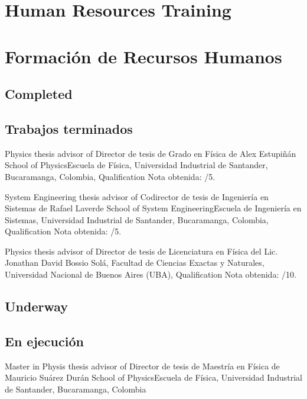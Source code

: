 \ifeng
\section*{Human Resources Training}
\else
\section*{Formación de Recursos Humanos}
\fi


\ifeng
\subsection*{Completed}
\else
\subsection*{Trabajos terminados}
\fi

\ifeng
Physics thesis advisor of
\else
Director de tesis de Grado en Física de
\fi
Alex Estupiñán \at \ifeng School of Physics\else Escuela de Física\fi, Universidad Industrial de Santander, Bucaramanga, Colombia, \ifeng Qualification \else Nota obtenida: /5.

\ifeng
System Engineering thesis advisor of
\else
Codirector de tesis de Ingeniería en Sistemas de
\fi
Rafael Laverde \at \ifeng School of System Engineering\else Escuela de Ingeniería en Sistemas\fi, Universidad Industrial de Santander, Bucaramanga, Colombia, \ifeng Qualification \else Nota obtenida: /5.

\ifeng
Physics thesis advisor of
\else
Director de tesis de Licenciatura en Física del
\fi
Lic. Jonathan David Bossio Solá, \at Facultad de Ciencias Exactas y Naturales, Universidad Nacional de Buenos Aires (UBA), \ifeng Qualification \else Nota obtenida: /10.

\ifeng
\subsection*{Underway}
\else
\subsection*{En ejecución}
\fi

\ifeng
Master in Physis thesis advisor of
\else
Director de tesis de Maestría en Física de
\fi
Mauricio Suárez Durán \at \ifeng School of Physics\else Escuela de Física\fi, Universidad Industrial de Santander, Bucaramanga, Colombia

